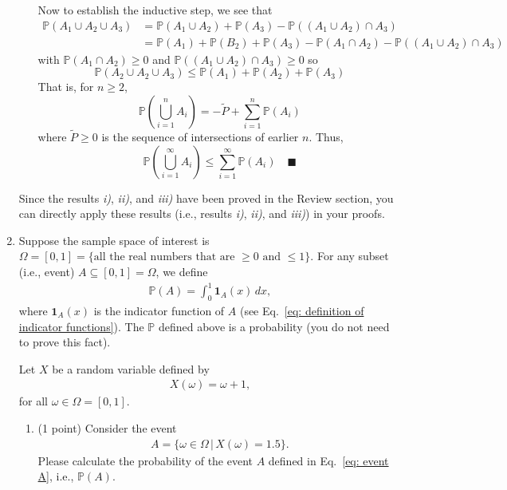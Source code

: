 \documentclass[11pt,letterpaper, leqno]{article}
\numberwithin{equation}{section}
\numberwithin{theorem}{section}
\numberwithin{lemma}{section}
\numberwithin{corollary}{section}
\numberwithin{definition}{section}
\numberwithin{proposition}{section}
\numberwithin{remark}{section}
\numberwithin{example}{section}
\renewcommand{\P}{\mathbb{P}}
\renewcommand{\qed}{\quad \blacksquare}
\begin{document}
\begin{enumerate}
\begin{itemize}
            Now to establish the inductive step, we see that 
            \begin{align*}
                \P(A_1 \cup A_2 \cup A_3) &= \P(A_1 \cup A_2) + \P(A_3) - \P((A_1 \cup A_2) \cap A_3)\\
                &= \P(A_1) + \P(B_2) +\P(A_3) - \P(A_1 \cap A_2) - \P((A_1 \cup A_2) \cap A_3)
            \end{align*} 
            with $\P(A_1 \cap A_2) \geq 0$ and $\P((A_1 \cup A_2) \cap A_3) \geq 0$
            so 
            \[\P(A_2 \cup A_2 \cup A_3) \leq \P(A_1) + \P(A_2) + \P(A_3)\]
            That is, for $n \geq 2$, 
            \[\P\left(\bigcup_{i=1}^n A_i\right) = -\tilde P + \sum_{i=1}^n \P(A_i)\]
            where $\tilde P \geq 0$ is the sequence of intersections of earlier $n$.
            Thus,   
            \[\P\left(\bigcup_{i=1}^\infty A_i\right) \leq \sum_{i=1}^\infty \P(A_i) \qed\]
             
        \color{red}
    \end{itemize}
    Since the results \textit{i)}, \textit{ii)}, and \textit{iii)} have been proved in the Review section, you can directly apply these results (i.e., results \textit{i)}, \textit{ii)}, and \textit{iii)}) in your proofs.

    \pagebreak 

    \item Suppose the sample space of interest is $\Omega=[0,1]=\{\text{all the real numbers that are $\ge0$ and $\le 1$}\}$. For any subset (i.e., event) $A\subseteq [0,1]=\Omega$, we define
    \begin{align*}
        \mathbb{P}(A)=\int_{0}^1 \mathbf{1}_A(x) \, dx,
    \end{align*}
    where $\mathbf{1}_A(x)$ is the indicator function of $A$ (see Eq.~\eqref{eq: definition of indicator functions}). The $\mathbb{P}$ defined above is a probability (you do not need to prove this fact). 
    
    Let $X$ be a random variable defined by
    \begin{align*}
        X(\omega)=\omega+1,
    \end{align*}
    for all $\omega\in\Omega=[0,1]$.

    \begin{enumerate}
        \item (1 point) Consider the event
        \begin{align}\label{eq: event A}
            A=\{\omega\in\Omega \,\vert\, X(\omega)=1.5\}.
        \end{align}
        Please calculate the probability of the event $A$ defined in Eq.~\eqref{eq: event A}, i.e., $\mathbb{P}(A)$.


\end{enumerate}
\end{enumerate}
\end{document}
